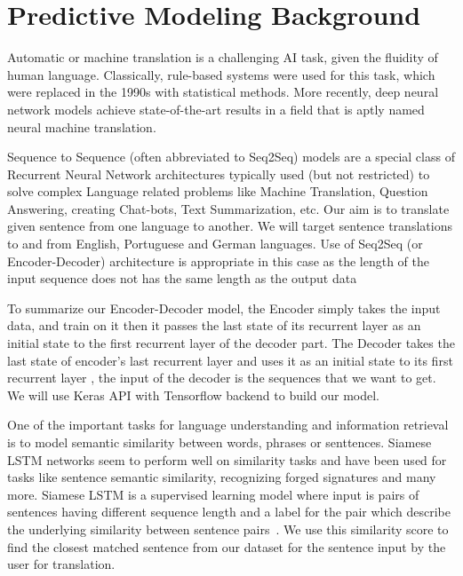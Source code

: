 \documentclass[runningheads]{llncs}
\begin{document}
	\section{Predictive Modeling Background}
	Automatic or machine translation is a challenging AI task, given the fluidity of human language. Classically, rule-based systems were used for this task, which were replaced in the 1990s with statistical methods. More recently, deep neural network models achieve state-of-the-art results in a field that is aptly named neural machine translation. ~\cite{ref_url16}
	
	Sequence to Sequence (often abbreviated to Seq2Seq) models are a special class of Recurrent Neural Network architectures typically used (but not restricted) to solve complex Language related problems like Machine Translation, Question Answering, creating Chat-bots, Text Summarization, etc. Our aim is to translate given sentence from one language to another. We will target sentence translations to and from English, Portuguese and German languages. Use of Seq2Seq (or Encoder-Decoder) architecture is appropriate in this case as the length of the input sequence  does not has the same length as the output data
	
	To summarize our Encoder-Decoder model, the Encoder simply takes the input data, and train on it then it passes the last state of its recurrent layer as an initial state to the first recurrent layer of the decoder part. The Decoder takes the last state of encoder’s last recurrent layer and uses it as an initial state to its first recurrent layer , the input of the decoder is the sequences that we want to get. We will use Keras API with Tensorflow backend to build our model.
	
	One of the important tasks for language understanding and information retrieval is to model semantic similarity between words, phrases or senttences. Siamese LSTM networks seem to perform well on similarity tasks and have been used for tasks like sentence semantic similarity, recognizing forged signatures and many more.
	Siamese LSTM is a supervised learning model where input is pairs of sentences having different sequence length and a label for the pair which describe the underlying similarity between sentence pairs~\cite{ref_url21}. We use this similarity score to find the closest matched sentence from our dataset for the sentence input by the user for translation.
	
	
\end{document}
